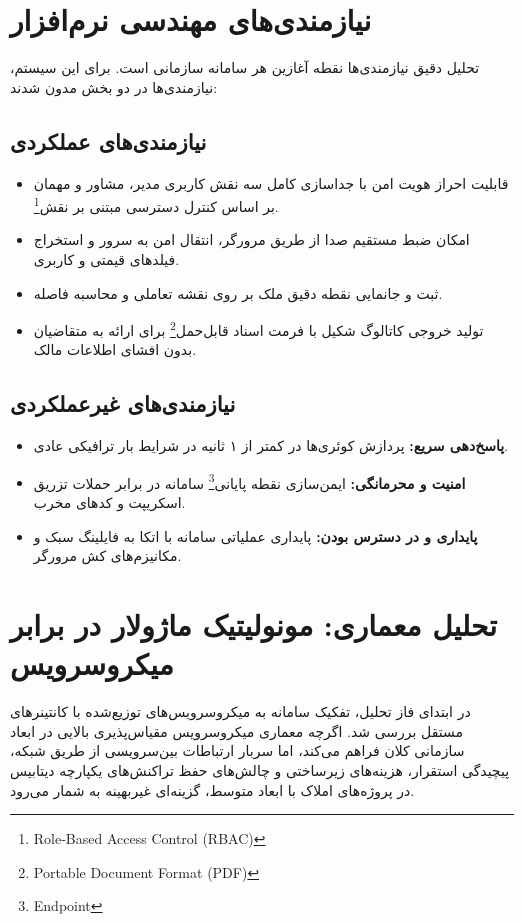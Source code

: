 \documentclass[11pt, a4paper]{report}
\newcommand{\enfootnote}[1]{\footnote{\foreignlanguage{english}{#1}}}
\begin{document}
\section{نیازمندی‌های مهندسی نرم‌افزار}
تحلیل دقیق نیازمندی‌ها نقطه آغازین هر سامانه سازمانی است. برای این سیستم، نیازمندی‌ها در دو بخش مدون شدند:

\subsection{نیازمندی‌های عملکردی}
\begin{itemize}
    \item قابلیت احراز هویت امن با جداسازی کامل سه نقش کاربری مدیر، مشاور و مهمان بر اساس کنترل دسترسی مبتنی بر نقش\enfootnote{Role-Based Access Control (RBAC)}.
    \item امکان ضبط مستقیم صدا از طریق مرورگر، انتقال امن به سرور و استخراج فیلدهای قیمتی و کاربری.
    \item ثبت و جانمایی نقطه دقیق ملک بر روی نقشه تعاملی و محاسبه فاصله.
    \item تولید خروجی کاتالوگ شکیل با فرمت اسناد قابل‌حمل\enfootnote{Portable Document Format (PDF)} برای ارائه به متقاضیان بدون افشای اطلاعات مالک.
\end{itemize}

\subsection{نیازمندی‌های غیرعملکردی}
\begin{itemize}
    \item \textbf{پاسخ‌دهی سریع:} پردازش کوئری‌ها در کمتر از ۱ ثانیه در شرایط بار ترافیکی عادی.
    \item \textbf{امنیت و محرمانگی:} ایمن‌سازی نقطه پایانی\enfootnote{Endpoint} سامانه در برابر حملات تزریق اسکریپت و کدهای مخرب.
    \item \textbf{پایداری و در دسترس بودن:} پایداری عملیاتی سامانه با اتکا به فایلینگ سبک و مکانیزم‌های کش مرورگر.
\end{itemize}

\section{تحلیل معماری: مونولیتیک ماژولار در برابر میکروسرویس}
در ابتدای فاز تحلیل، تفکیک سامانه به میکروسرویس‌های توزیع‌شده با کانتینرهای مستقل بررسی شد. اگرچه معماری میکروسرویس مقیاس‌پذیری بالایی در ابعاد سازمانی کلان فراهم می‌کند، اما سربار ارتباطات بین‌سرویسی از طریق شبکه، پیچیدگی استقرار، هزینه‌های زیرساختی و چالش‌های حفظ تراکنش‌های یکپارچه دیتابیس در پروژه‌های املاک با ابعاد متوسط، گزینه‌ای غیربهینه به شمار می‌رود.
\end{document}
